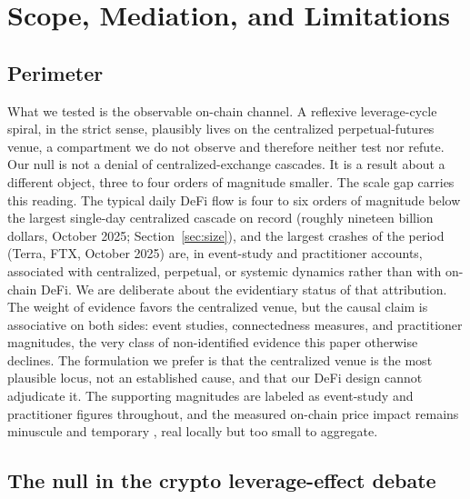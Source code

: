 \section{Scope, Mediation, and Limitations}
\label{sec:discussion}

\subsection{Perimeter}
\label{sec:scope}

What we tested is the observable on-chain channel. A reflexive
leverage-cycle spiral, in the strict sense, plausibly lives on the
centralized perpetual-futures venue, a compartment we do not observe and
therefore neither test nor refute. Our null is not a denial of
centralized-exchange cascades. It is a result about a different object, three
to four orders of magnitude smaller. The scale gap carries this reading. The
typical daily DeFi flow is four to six orders of magnitude below the largest
single-day centralized cascade on record (roughly nineteen billion dollars,
October 2025; Section~\ref{sec:size}), and the largest crashes of the period (Terra, FTX,
October 2025) are, in event-study and practitioner accounts, associated with
centralized, perpetual, or systemic dynamics rather than with on-chain DeFi. We are deliberate about the evidentiary
status of that attribution. The weight of evidence favors the centralized
venue, but the causal claim is associative on both sides: event studies,
connectedness measures, and practitioner magnitudes, the very class of
non-identified evidence this paper otherwise declines. The formulation we
prefer is that the centralized venue is the most plausible locus, not an
established cause, and that our DeFi design cannot adjudicate it. The
supporting magnitudes are labeled as event-study and practitioner figures
throughout, and the measured on-chain price impact remains minuscule and temporary \citep{tian2025}, real locally but too small to aggregate.

\subsection{The null in the crypto leverage-effect debate}
\label{sec:mediation}

